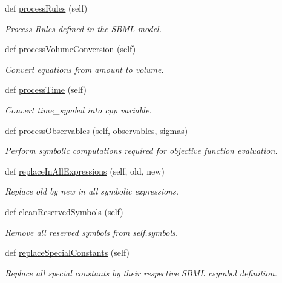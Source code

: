 \begin{DoxyCompactItemize}
def \mbox{\hyperlink{classamici_1_1sbml__import_1_1_sbml_importer_a7df6b4ae4e3e757bc8de5e0cc54fe16b}{process\+Rules}} (self)
\begin{DoxyCompactList}\small\item\em Process Rules defined in the S\+B\+ML model. \end{DoxyCompactList}\item 
def \mbox{\hyperlink{classamici_1_1sbml__import_1_1_sbml_importer_af2a2cbf8550d30fc0e95a875758b8262}{process\+Volume\+Conversion}} (self)
\begin{DoxyCompactList}\small\item\em Convert equations from amount to volume. \end{DoxyCompactList}\item 
def \mbox{\hyperlink{classamici_1_1sbml__import_1_1_sbml_importer_a2819c6ad1b541e49e728aa172e57208e}{process\+Time}} (self)
\begin{DoxyCompactList}\small\item\em Convert time\+\_\+symbol into cpp variable. \end{DoxyCompactList}\item 
def \mbox{\hyperlink{classamici_1_1sbml__import_1_1_sbml_importer_a903b87aa6c483832424fa2cc76adc4d5}{process\+Observables}} (self, observables, sigmas)
\begin{DoxyCompactList}\small\item\em Perform symbolic computations required for objective function evaluation. \end{DoxyCompactList}\item 
def \mbox{\hyperlink{classamici_1_1sbml__import_1_1_sbml_importer_a1579faf8b188de11ed58ddbebc3c20a7}{replace\+In\+All\+Expressions}} (self, old, new)
\begin{DoxyCompactList}\small\item\em Replace \textquotesingle{}old\textquotesingle{} by \textquotesingle{}new\textquotesingle{} in all symbolic expressions. \end{DoxyCompactList}\item 
def \mbox{\hyperlink{classamici_1_1sbml__import_1_1_sbml_importer_a122b9921e2fb5bd0fc75310c47413dd1}{clean\+Reserved\+Symbols}} (self)
\begin{DoxyCompactList}\small\item\em Remove all reserved symbols from self.\+symbols. \end{DoxyCompactList}\item 
def \mbox{\hyperlink{classamici_1_1sbml__import_1_1_sbml_importer_a5348e7b5041334f8c54b45c5c928dea0}{replace\+Special\+Constants}} (self)
\begin{DoxyCompactList}\small\item\em Replace all special constants by their respective S\+B\+ML csymbol definition. \end{DoxyCompactList}\end{DoxyCompactItemize}
